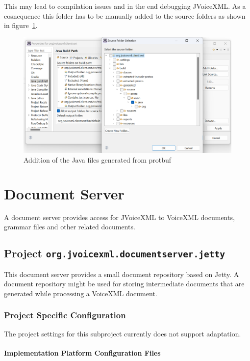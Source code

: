 \documentclass[11pt,a4paper]{article}
\begin{document}
This may lead to compilation issues and in the end debugging JVoiceXML.
As a cosnequence this folder has to be manually added to the source folders as
shown in figure~\ref{fig:eclipse-add-protobuf-generated}.
\begin{figure}
\includegraphics[width=\linewidth]{eclipse-add-protobuf-generated.png}
\caption{Addition of the Java files generated from protbuf}
\label{fig:eclipse-add-protobuf-generated}
\end{figure}


\section{Document Server}

A document server provides access for JVoiceXML to VoiceXML documents, grammar files and 
other related documents.

\subsection{Project \texttt{org.jvoicexml.documentserver.jetty}}

This document server provides a small document repository based on Jetty. A document repository 
might be used for storing intermediate documents that are generated while processing a VoiceXML document.

\subsubsection{Project Specific Configuration}

The project settings for this subproject currently does not support adaptation.

\paragraph{Implementation Platform Configuration Files}
\end{document}
